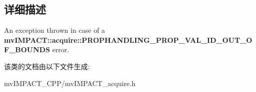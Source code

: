 \subsection{详细描述}
An exception thrown in case of a {\bfseries mv\+I\+M\+P\+A\+C\+T\+::acquire\+::\+P\+R\+O\+P\+H\+A\+N\+D\+L\+I\+N\+G\+\_\+\+P\+R\+O\+P\+\_\+\+V\+A\+L\+\_\+\+I\+D\+\_\+\+O\+U\+T\+\_\+\+O\+F\+\_\+\+B\+O\+U\+N\+D\+S} error. 

该类的文档由以下文件生成\+:\begin{DoxyCompactItemize}
\item 
mv\+I\+M\+P\+A\+C\+T\+\_\+\+C\+P\+P/mv\+I\+M\+P\+A\+C\+T\+\_\+acquire.\+h\end{DoxyCompactItemize}
